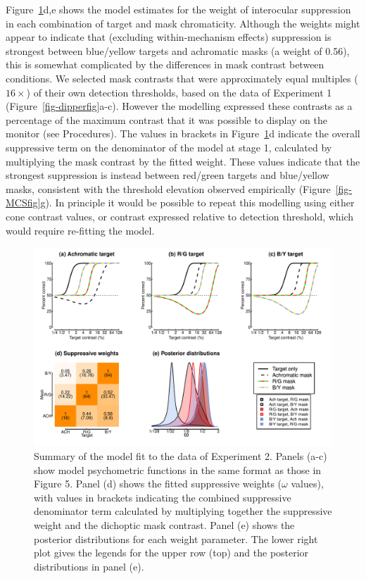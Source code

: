 \documentclass[
  letterpaper,
  DIV=11,
  numbers=noendperiod]{scrartcl}
\begin{document}
Figure~\ref{fig-MCSmodel}d,e shows the model estimates for the weight of
interocular suppression in each combination of target and mask
chromaticity. Although the weights might appear to indicate that
(excluding within-mechanism effects) suppression is strongest between
blue/yellow targets and achromatic masks (a weight of 0.56), this is
somewhat complicated by the differences in mask contrast between
conditions. We selected mask contrasts that were approximately equal
multiples (\(16\times\)) of their own detection thresholds, based on the
data of Experiment 1 (Figure~\ref{fig-dipperfig}a-c). However the
modelling expressed these contrasts as a percentage of the maximum
contrast that it was possible to display on the monitor (see
Procedures). The values in brackets in Figure~\ref{fig-MCSmodel}d
indicate the overall suppressive term on the denominator of the model at
stage 1, calculated by multiplying the mask contrast by the fitted
weight. These values indicate that the strongest suppression is instead
between red/green targets and blue/yellow masks, consistent with the
threshold elevation observed empirically (Figure~\ref{fig-MCSfig}g). In
principle it would be possible to repeat this modelling using either
cone contrast values, or contrast expressed relative to detection
threshold, which would require re-fitting the model.

\begin{figure}

{\centering \includegraphics{Figures/MCSmodel.pdf}

}

\caption{\label{fig-MCSmodel}Summary of the model fit to the data of
Experiment 2. Panels (a-c) show model psychometric functions in the same
format as those in Figure 5. Panel (d) shows the fitted suppressive
weights (\(\omega\) values), with values in brackets indicating the
combined suppressive denominator term calculated by multiplying together
the suppressive weight and the dichoptic mask contrast. Panel (e) shows
the posterior distributions for each weight parameter. The lower right
plot gives the legends for the upper row (top) and the posterior
distributions in panel (e).}

\end{figure}
\end{document}
